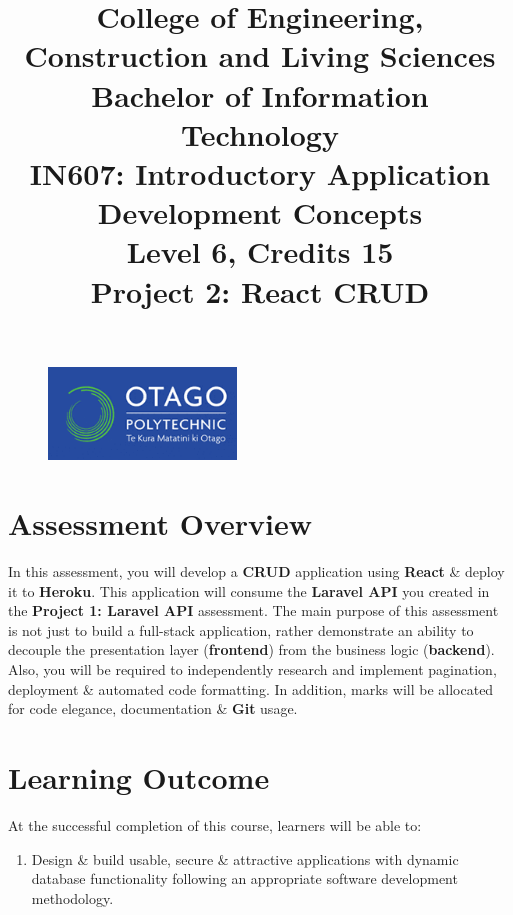 \documentclass{article}
\author{}
\begin{document}
\begin{figure}
    \centering
    \includegraphics[width=50mm]{../img/logo.png}
\end{figure}

\title{College of Engineering, Construction and Living Sciences\\Bachelor of Information Technology\\IN607: Introductory Application Development Concepts\\Level 6, Credits 15\\\textbf{Project 2: React CRUD}}
\date{}
\maketitle

\section*{Assessment Overview}
In this assessment, you will develop a \textbf{CRUD} application using \textbf{React} \& deploy it to \textbf{Heroku}. This application will consume the \textbf{Laravel API} you created in the \textbf{Project 1: Laravel API} assessment. The main purpose of this assessment is not just to build a full-stack application, rather demonstrate an ability to decouple the presentation layer (\textbf{frontend}) from the business logic (\textbf{backend}). Also, you will be required to independently research and implement pagination, deployment \& automated code formatting. In addition, marks will be allocated for code elegance, documentation \& \textbf{Git} usage.

\section*{Learning Outcome}
At the successful completion of this course, learners will be able to:
\begin{enumerate}
    \item Design \& build usable, secure \& attractive applications with dynamic database functionality following an appropriate software development methodology.
\end{enumerate}
\end{document}
